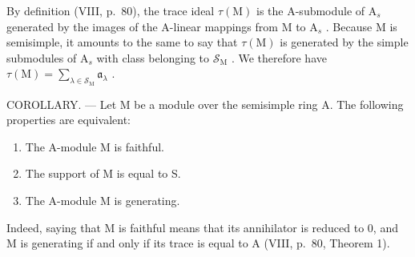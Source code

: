 By definition (VIII, p.~80), the trace ideal \(\tau(\mathrm{M})\) is the A-submodule of \(\mathrm{A}_s\) generated by the images of the A-linear mappings from M to \(\mathrm{A}_s\) . Because M is semisimple, it amounts to the same to say that \(\tau(\mathrm{M})\) is generated by the simple submodules of \(\mathrm{A}_s\) with class belonging to \(\mathcal{S}_{\mathrm{M}}\) . We therefore have \(\tau(\mathrm{M}) = \sum_{\lambda \in \mathcal{S}_{\mathrm{M}}} \mathfrak{a}_{\lambda}\) .

COROLLARY. --- Let M be a module over the semisimple ring A. The following properties are equivalent:

\begin{enumerate}
\def\labelenumi{(\roman{enumi})}
\item
  The A-module M is faithful.
\item
  The support of M is equal to S.
\item
  The A-module M is generating.
\end{enumerate}

Indeed, saying that M is faithful means that its annihilator is reduced to 0, and M is generating if and only if its trace is equal to A (VIII, p.~80, Theorem 1).

